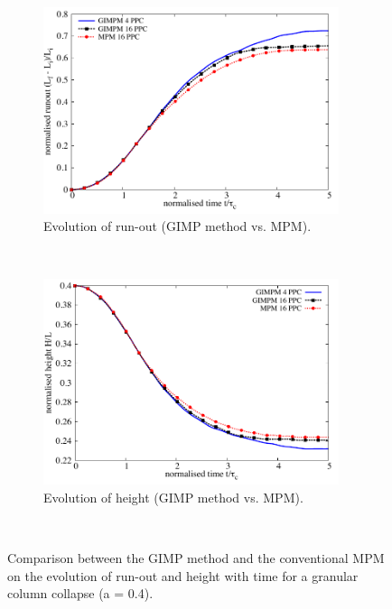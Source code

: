 \begin{figure}[tbhp]
	\centering
	\begin{subfigure}[b]{0.95\textwidth}
		\centering
		\includegraphics[width=0.95\textwidth]{Runout_MPM_GIMPM}
		\caption{Evolution of run-out (GIMP method vs. MPM).}
		\label{fig:Runout_MPM_GIMPM}
	\end{subfigure} \\
	\begin{subfigure}[b]{0.95\textwidth}
		\centering 
		\includegraphics[width=0.95\textwidth]{Height_MPM_GIMP}
		\caption{Evolution of height (GIMP method vs. MPM).}
		\label{fig:Height_MPM_GIMP}
	\end{subfigure} \\
	\caption{Comparison between the GIMP method and the conventional MPM on the 
	evolution of run-out and height with time for a granular column collapse (a 
	= 0.4).}
	\label{fig:MPM_GIMP}
\end{figure}


